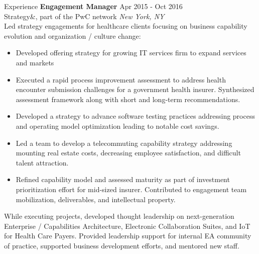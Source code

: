 \documentclass{resume} %
\begin{document}
\begin{rSection}{Experience}
\textbf{Engagement Manager} \hfill Apr 2015 - Oct 2016\\
Strategy\&, part of the PwC network \hfill \textit{New York, NY}\\
Led strategy engagements for healthcare clients focusing on business capability evolution and organization / culture change:
\begin{itemize}
 \itemsep -3pt {}
\item Developed offering strategy for growing IT services firm to expand services and markets
 \item Executed a rapid process improvement assessment to address health encounter submission challenges for a government health insurer. Synthesized assessment framework along with short and long-term recommendations.
 \item Developed a strategy to advance software testing practices addressing process and operating model optimization leading to notable cost savings.
\item Led a team to develop a telecommuting capability strategy addressing mounting real estate costs, decreasing employee satisfaction, and difficult talent attraction.
\item Refined capability model and assessed maturity as part of investment prioritization effort for mid-sized insurer. Contributed to engagement team mobilization, deliverables, and intellectual property.
\end{itemize}
While executing projects, developed thought leadership on next-generation Enterprise / Capabilities Architecture, Electronic Collaboration Suites, and IoT for Health Care Payers. Provided leadership support for internal EA community of practice, supported business development efforts, and mentored new staff.


\end{rSection}
\end{document}
